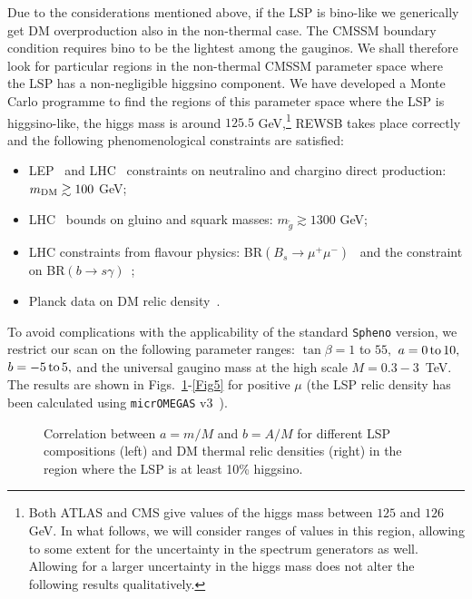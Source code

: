 \documentclass[12pt,a4paper]{book}
\newcommand{\bi}{\begin{itemize}}
\newcommand{\ei}{\end{itemize}}
\begin{document}
Due to the considerations mentioned above, if the LSP is bino-like we generically get DM overproduction also in the non-thermal case. The CMSSM boundary condition requires bino to be the lightest among the gauginos. We shall therefore look for particular regions in the non-thermal CMSSM parameter space where the LSP has a non-negligible higgsino component.  We have developed a Monte Carlo programme to find the regions of this parameter space where the LSP is higgsino-like, the higgs mass is around $125.5$ GeV,\footnote{Both ATLAS and CMS give values of the higgs mass between $125$ and $126$ GeV. In what follows,  we will consider ranges of values in this region, allowing to some extent for the uncertainty in the spectrum generators as well. Allowing for a larger uncertainty in the higgs mass does not alter the following results qualitatively.} REWSB takes place correctly and the following phenomenological constraints are satisfied: 
\bi
\item LEP~\cite{LEP1, LEP2, LEP3, LEP4} and LHC~\cite{Aad:2014wea, Aad:2012hm, Chatrchyan:2012lia, Aad:2014vma, Khachatryan:2014qwa} constraints on neutralino and chargino direct production: $m_{\rm DM} \gtrsim 100$ GeV;
\item LHC~\cite{Aad:2014wea, Aad:2012hm, Chatrchyan:2012lia, Aad:2014vma, Khachatryan:2014qwa} bounds on gluino and squark masses: $m_{\tilde{g}} \gtrsim 1300$ GeV;
\item LHC constraints from flavour physics: BR$(B_s \rightarrow \mu^+ \mu^-)$~\cite{CMS:2014xfa} and the constraint on BR$(b\rightarrow s\gamma)$~\cite{Agashe:2014kda};
\item Planck data on DM relic density~\cite{Ade:2015xua}.
\ei
To avoid complications with the applicability of the standard \texttt{Spheno} version, we restrict our scan on the following parameter ranges: $\tan\beta=1$ to $55,$ $a=0\,{\rm to}\,10,$ $b=-5\,{\rm to}\,5,$ and the universal gaugino mass at the high scale $M=0.3-3$~TeV. The results are shown in Figs.~\ref{Fig3}-\ref{Fig5} for positive $\mu$ (the LSP relic density has been calculated using \verb"micrOMEGAS" v3~\cite{Belanger:2013oya}).\\

\begin{figure}
\centering
{} \quad
{} 
\caption{Correlation between $a=m/M$ and $b=A/M$ for different LSP compositions (left) and DM thermal relic densities (right) in the region where the LSP is at least 10\% higgsino.}
\label{Fig3}
\end{figure}
\end{document}
